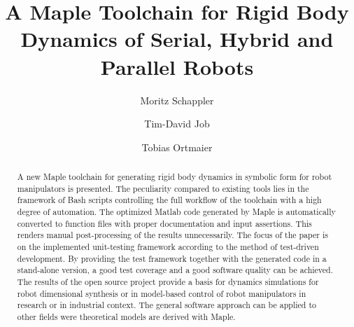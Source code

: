 \documentclass[runningheads]{llncs}
\begin{document}
%
\title{A Maple Toolchain for Rigid Body Dynamics of Serial, Hybrid and Parallel Robots}%
%
%
\author{Moritz Schappler \and Tim-David Job \and Tobias Ortmaier}
%
%
%
\maketitle              %
%
\begin{abstract}
A new Maple toolchain for generating rigid body dynamics in symbolic form for robot manipulators is presented.
The peculiarity compared to existing tools lies in the framework of Bash scripts controlling the full workflow of the toolchain with a high degree of automation. 
The optimized Matlab code generated by Maple is automatically converted to function files with proper documentation and input assertions.
This renders manual post-processing of the results unnecessarily.
The focus of the paper is on the implemented unit-testing framework according to the method of test-driven development.
By providing the test framework together with the generated code in a stand-alone version, a good test coverage and a good software quality can be achieved.
The results of the open source project provide a basis for dynamics simulations for robot dimensional synthesis or in model-based control of robot manipulators in research or in industrial context.
The general software approach can be applied to other fields were theoretical models are derived with Maple.

\end{abstract}
%
%
%
\end{document}
